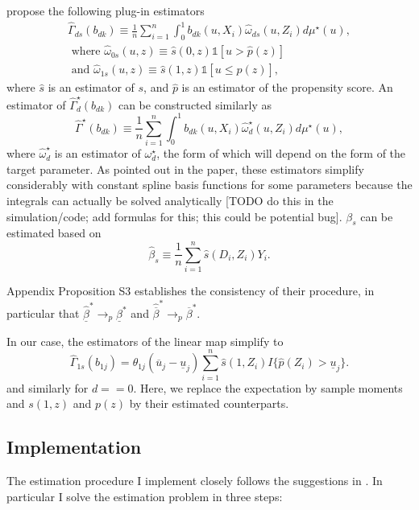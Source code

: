 \documentclass{article}
\begin{document}
\citet{mogstad2018using} propose the following plug-in estimators 
$$
\begin{gathered}
\hat{\Gamma}_{d s}\left(b_{d k}\right) \equiv \frac{1}{n} \sum_{i=1}^n \int_0^1 b_{d k}\left(u, X_i\right) \hat{\omega}_{d s}\left(u, Z_i\right) d \mu^{\star}(u), \\
\text { where } \hat{\omega}_{0 s}(u, z) \equiv \hat{s}(0, z) \mathbb{1}[u>\hat{p}(z)] \\
\text { and } \hat{\omega}_{1 s}(u, z) \equiv \hat{s}(1, z) \mathbb{1}[u \leq \hat{p}(z)],
\end{gathered}
$$
where $\hat{s}$ is an estimator of $s$, and $\hat{p}$ is an estimator of the propensity score. An estimator of $\hat{\Gamma}_d^{\star}\left(b_{d k}\right)$ can be constructed similarly as
$$
\hat{\Gamma}^{\star}\left(b_{d k}\right) \equiv \frac{1}{n} \sum_{i=1}^n \int_0^1 b_{d k}\left(u, X_i\right) \hat{\omega}_d^{\star}\left(u, Z_i\right) d \mu^{\star}(u),
$$
where $\hat{\omega}_d^{\star}$ is an estimator of $\omega_d^{\star}$, the form of which will depend on the form of the target parameter. 
As pointed out in the paper, these estimators simplify considerably with constant spline basis functions for some parameters because the integrals can actually be solved analytically [TODO do this in the simulation/code; add formulas for this; this could be potential bug].
$\beta_s$ can be estimated based on
$$
\hat{\beta}_s \equiv \frac{1}{n} \sum_{i=1}^n \hat{s}\left(D_i, Z_i\right) Y_i.
$$

Appendix Proposition S3 establishes the consistency of their procedure, in particular that $\hat{\underline{\beta}}^*\to_p \underline{\beta}^*$ and $\hat{\overline{\beta}}^*\to_p\overline{\beta}^*$.

In our case, the estimators of the linear map simplify to
\begin{equation}
    \label{eq:est_weights_maps}
    \hat{\Gamma}_{1s}(b_{1j}) =\theta_{1j} (\overline{u}_j-\underline{u}_j)\sum_{i=1}^{n} \hat{s}(1,Z_i) I\{\hat{p}(Z_i)> \underline{u}_j\}.
\end{equation}
and similarly for $d==0$. Here, we replace the expectation by sample moments and $s(1,z)$ and $p(z)$ by their estimated counterparts.

\subsection{Implementation}
The estimation procedure I implement closely follows the suggestions in \citet{mogstad2018using}. In particular I solve the estimation problem in three steps:
\end{document}
